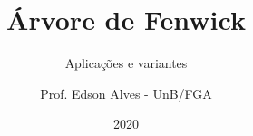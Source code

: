 \title{Árvore de Fenwick}
\subtitle{Aplicações e variantes}
\author{Prof. Edson Alves - UnB/FGA}
\date{2020}
